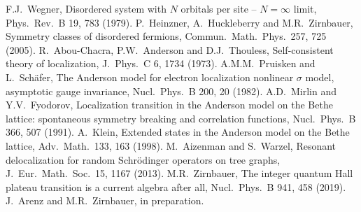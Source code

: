 \documentclass[aps,prl,twocolumn,letterpaper,superscriptaddress]{revtex4-2}
\begin{document}
\begin{thebibliography}{99}
 F.J.\ Wegner, Disordered system with $N$ orbitals per site -- $N = \infty$ limit, Phys.\ Rev.\ B 19, 783 (1979).
 P.\ Heinzner, A.\ Huckleberry and M.R.\ Zirnbauer, Symmetry classes of disordered fermions, Commun.\ Math.\ Phys.\ 257, 725 (2005).
 R.\ Abou-Chacra, P.W.\ Anderson and D.J.\ Thouless, Self-consistent theory of localization, J.\ Phys.\ C 6, 1734 (1973).
 A.M.M.\ Pruisken and L.\ Sch\"afer, The Anderson model for electron localization nonlinear $\sigma$ model, asymptotic gauge invariance, Nucl.\ Phys.\ B 200, 20 (1982).
 A.D.\ Mirlin and Y.V.\ Fyodorov, Localization transition in the Anderson model on the Bethe lattice: spontaneous symmetry breaking and correlation functions, Nucl.\ Phys.\ B 366, 507 (1991).
 A.\ Klein, Extended states in the Anderson model on the Bethe lattice, Adv.\ Math.\ 133, 163 (1998).
 M.\ Aizenman and S.\ Warzel, Resonant delocalization for random Schr\"odinger operators on tree graphs, J.\ Eur.\ Math.\ Soc.\ 15, 1167 (2013).
 M.R.\ Zirnbauer, The integer quantum Hall plateau transition is a current algebra after all, Nucl.\ Phys.\ B 941, 458 (2019).
 J.\ Arenz and M.R.\ Zirnbauer, in preparation.
\end{thebibliography}
\end{document}
